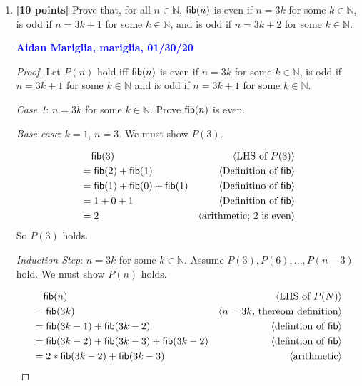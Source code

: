 \documentclass[11pt,fleqn]{article}
\newcommand{\mname}[1]{\mbox{\sf #1}}
\newcommand{\pnote}[1]{{\langle \text{#1} \rangle}}
\begin{document}
\begin{enumerate}
\begin{proof}
  \medskip

  Therefore $P(n)$ holds for all $n \in \mathbb{N}$ by weak induction.
  \end{proof}

  \bigskip

  \item \textbf{[10 points]} Prove that, for all $n \in \mathbb{N}$,
    $\mname{fib}(n)$ is even if $n = 3k$ for some $k \in \mathbb{N}$,
    is odd if $n = 3k + 1$ for some $k \in \mathbb{N}$, and is odd if
    $n = 3k + 2$ for some $k \in \mathbb{N}$.

  \bigskip

  \textcolor{blue}{\textbf{Aidan Mariglia, mariglia, 01/30/20}}

 \begin{proof}
  Let $P(n)$ hold iff $\mname{fib}(n)$ is even if $n = 3k$ for some
  $k \in \mathbb{N}$, is odd if $n = 3k+1$ for some $k \in \mathbb{N}$
  and is odd if $n = 3k+1$ for some $k \in \mathbb{N}$.

  \bigskip

  \emph{Case 1}: $n = 3k$ for some $k \in \mathbb{N}$. Prove $\mname{fib}(n)$
  is even.

  \emph{Base case}: $k = 1$, $n = 3$. We must show $P(3)$.

  \begin{align*}
  &\phantom{{}=} \mname{fib}(3) & \pnote{LHS of $P(3)$}\\
  &= \mname{fib}(2) + \mname{fib}(1) & \pnote{Definition of $\mname{fib}$}\\
  &= \mname{fib}(1) + \mname{fib}(0) + \mname{fib}(1) & \pnote{Definitino of $\mname{fib}$}\\
  &= 1 + 0 + 1 & \pnote{Definition of $\mname{fib}$}\\
  &= 2 & \pnote{arithmetic; $2$ is even}
  \end{align*}
  So $P(3)$ holds.

  \emph{Induction Step}: $n = 3k$ for some $k \in \mathbb{N}$. Assume $P(3),P(6),\dots,P(n - 3)$ hold. We must
  show $P(n)$ holds.

  \begin{align*}
  &\phantom{{}=} \mname{fib}(n) & \pnote{LHS of $P(N)$}\\
  &= \mname{fib}(3k) & \pnote{$n = 3k$, thereom definition}\\
  &= \mname{fib}(3k - 1) + \mname{fib}(3k-2) & \pnote{defintion of $\mname{fib}$}\\
  &= \mname{fib}(3k - 2) + \mname{fib}(3k-3) + \mname{fib}(3k-2) & \pnote{defintion of $\mname{fib}$}\\
  &= 2 * \mname{fib}(3k - 2) + \mname{fib}(3k-3) & \pnote{arithmetic}\\
  \end{align*}


\end{proof}
\end{enumerate}
\end{document}
